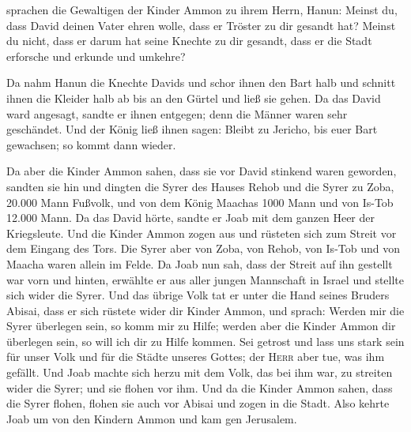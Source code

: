  sprachen die Gewaltigen der Kinder Ammon zu ihrem Herrn,
Hanun: Meinst du, dass David deinen Vater ehren wolle, dass er Tröster
zu dir gesandt hat? Meinst du nicht, dass er darum hat seine Knechte zu
dir gesandt, dass er die Stadt erforsche und erkunde und umkehre?

 Da nahm Hanun die Knechte Davids und schor ihnen den Bart
halb und schnitt ihnen die Kleider halb ab bis an den Gürtel und ließ
sie gehen.  Da das David ward angesagt, sandte er ihnen
entgegen; denn die Männer waren sehr geschändet. Und der König ließ
ihnen sagen: Bleibt zu Jericho, bis euer Bart gewachsen; so kommt dann
wieder.

 Da aber die Kinder Ammon sahen, dass sie vor David
stinkend waren geworden, sandten sie hin und dingten die Syrer des
Hauses Rehob und die Syrer zu Zoba, 20.000 Mann Fußvolk, und von dem
König Maachas 1000 Mann und von Is-Tob 12.000 Mann.  Da
das David hörte, sandte er Joab mit dem ganzen Heer der Kriegsleute.
 Und die Kinder Ammon zogen aus und rüsteten sich zum
Streit vor dem Eingang des Tors. Die Syrer aber von Zoba, von Rehob, von
Is-Tob und von Maacha waren allein im Felde.  Da Joab nun
sah, dass der Streit auf ihn gestellt war vorn und hinten, erwählte er
aus aller jungen Mannschaft in Israel und stellte sich wider die Syrer.
 Und das übrige Volk tat er unter die Hand seines Bruders
Abisai, dass er sich rüstete wider dir Kinder Ammon,  und
sprach: Werden mir die Syrer überlegen sein, so komm mir zu Hilfe;
werden aber die Kinder Ammon dir überlegen sein, so will ich dir zu
Hilfe kommen.  Sei getrost und lass uns stark sein für
unser Volk und für die Städte unseres Gottes; der \textsc{Herr} aber
tue, was ihm gefällt.  Und Joab machte sich herzu mit dem
Volk, das bei ihm war, zu streiten wider die Syrer; und sie flohen vor
ihm.  Und da die Kinder Ammon sahen, dass die Syrer
flohen, flohen sie auch vor Abisai und zogen in die Stadt. Also kehrte
Joab um von den Kindern Ammon und kam gen Jerusalem.

